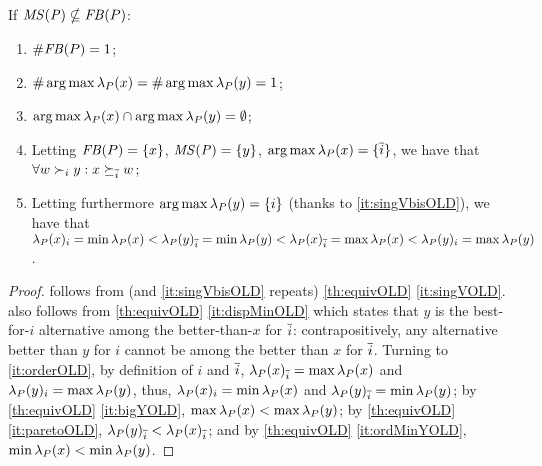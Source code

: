 \documentclass[pagesize, twoside=off, bibliography=totoc, DIV=calc, fontsize=12pt, a4paper]{scrartcl}
\begin{document}
\begin{corollary}
	\label{th:rhoMinOLD}
	If $\mathit{MS(P)} \nsubseteq \mathit{FB}(P)$:
	\begin{enumerate}
		\item $\# \mathit{FB}(P) = 1$;
		\item \label{it:singVCOLD} $\# \operatorname*{arg\,max} \lambda_P(x) = \# \operatorname*{arg\,max} \lambda_P(y) = 1$;
		\item \label{it:singVbisOLD} $\operatorname*{arg\,max} \lambda_P(x) \cap \operatorname*{arg\,max} \lambda_P(y) = \emptyset$;
		\item \label{it:rhoMinOLD} Letting $\mathit{FB}(P) = \{x\}$, $\mathit{MS(P)} = \{y\}$, $\operatorname*{arg\,max} \lambda_P(x) = \{\overline{i}\}$, we have that $\forall w \succ_i y: x \succeq_{\overline{i}} w$;
		\item \label{it:orderOLD} Letting furthermore $\operatorname*{arg\,max} \lambda_P(y) = \{i\}$ (thanks to \cref{it:singVbisOLD}), we have that $\lambda_P(x)_i = \min \lambda_P(x) < \lambda_P(y)_{\overline{i}} = \min \lambda_P(y) < \lambda_P(x)_{\overline{i}} = \max \lambda_P(x) < \lambda_P(y)_i = \max \lambda_P(y)$.
	\end{enumerate}
\end{corollary}
\begin{proof}
	 follows from (and \cref{it:singVbisOLD} repeats) \cref{th:equivOLD} \cref{it:singVOLD}.
	 also follows from \cref{th:equivOLD} \cref{it:dispMinOLD} which states that $y$ is the best-for-$i$ alternative among the better-than-$x$ for $\overline{i}$: contrapositively, any alternative better than $y$ for $i$ cannot be among the better than $x$ for $\overline{i}$.
	Turning to \cref{it:orderOLD}, by definition of $i$ and $\overline{i}$, $\lambda_P(x)_{\overline{i}} = \max \lambda_P(x)$ and $\lambda_P(y)_i = \max \lambda_P(y)$, thus, $\lambda_P(x)_i = \min \lambda_P(x)$ and $\lambda_P(y)_{\overline{i}} = \min \lambda_P(y)$; by \cref{th:equivOLD} \cref{it:bigYOLD}, $\max \lambda_P(x) < \max \lambda_P(y)$; by \cref{th:equivOLD} \cref{it:paretoOLD}, $\lambda_P(y)_{\overline{i}} < \lambda_P(x)_{\overline{i}}$; and by \cref{th:equivOLD} \cref{it:ordMinYOLD}, $\min \lambda_P(x) < \min \lambda_P(y)$.
\end{proof}
\end{document}
